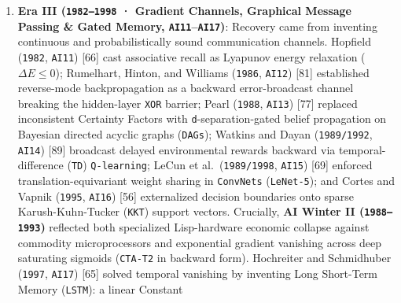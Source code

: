 \documentclass[10pt,letterpaper]{article}
\begin{document}
\begin{enumerate}
  {[}64{]}, and the \texttt{Hearsay-\allowbreak{}II} multi-specialist
  \texttt{Blackboard} workspace (\texttt{Erman\ et\ al.\allowbreak{}\ 1980},
  \texttt{AI10}) {[}60{]}. \textbf{\texttt{Hearsay-\allowbreak{}II} exposes the exact
  mechanistic cause of AI Winter I (\texttt{1974–1980})}: independent
  Knowledge Sources (\texttt{KSs}) communicated cleanly over a shared
  multi-level blackboard, \textbf{but hand-authored crisp rules lacked
  differentiable perceptual ingestion from noisy acoustic waveforms and
  lacked low-cost learned search priors}. Without a sound gradient or
  admissible pruning gate, competing parse hypotheses triggered
  \(O(b^d)\) combinatorial branching while heuristic
  \texttt{MYCIN}-style Certainty Factors (\texttt{CF}) accumulated
  non-Bayesian multi-hop drift (\texttt{CTA-T1}), collapsing
  \texttt{CpJ} as vocabularies and rule counts scaled past \(10^3\).
\item
  \textbf{Era III (\texttt{1982–1998} · Gradient Channels, Graphical
  Message Passing \& Gated Memory, \texttt{AI11}--\texttt{AI17})}:
  Recovery came from inventing continuous and probabilistically sound
  communication channels. Hopfield (\texttt{1982}, \texttt{AI11})
  {[}66{]} cast associative recall as Lyapunov energy relaxation
  (\(\Delta E \le 0\)); Rumelhart, Hinton, and Williams (\texttt{1986},
  \texttt{AI12}) {[}81{]} established reverse-mode backpropagation as a
  backward error-broadcast channel breaking the hidden-layer
  \texttt{XOR} barrier; Pearl (\texttt{1988}, \texttt{AI13}) {[}77{]}
  replaced inconsistent Certainty Factors with
  \texttt{d}-separation-gated belief propagation on Bayesian directed
  acyclic graphs (\texttt{DAGs}); Watkins and Dayan (\texttt{1989/1992},
  \texttt{AI14}) {[}89{]} broadcast delayed environmental rewards
  backward via temporal-difference (\texttt{TD}) \texttt{Q-\allowbreak{}learning};
  LeCun et al.~(\texttt{1989/1998}, \texttt{AI15}) {[}69{]} enforced
  translation-equivariant weight sharing in \texttt{ConvNets}
  (\texttt{LeNet-5}); and Cortes and Vapnik (\texttt{1995},
  \texttt{AI16}) {[}56{]} externalized decision boundaries onto sparse
  Karush-Kuhn-Tucker (\texttt{KKT}) support vectors. Crucially,
  \textbf{AI Winter II (\texttt{1988–1993})} reflected both specialized
  Lisp-hardware economic collapse against commodity microprocessors and
  exponential gradient vanishing across deep saturating sigmoids
  (\texttt{CTA-T2} in backward form). Hochreiter and Schmidhuber
  (\texttt{1997}, \texttt{AI17}) {[}65{]} solved temporal vanishing by
  inventing Long Short-Term Memory (\texttt{LSTM}): a linear Constant

\end{enumerate}
\end{document}
